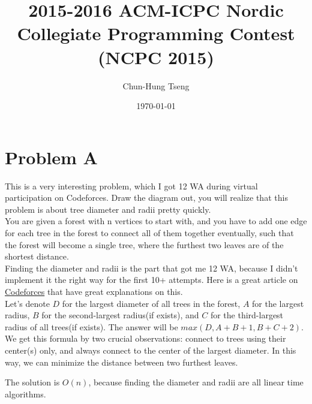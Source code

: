 \documentclass[10pt]{article}
\title{2015-2016 ACM-ICPC Nordic Collegiate Programming Contest (NCPC 2015)} %
\author{Chun-Hung Tseng}
\date{\today}
\begin{document}
 

\begin{titlepage}
\maketitle
\end{titlepage}




\section*{Problem A}

This is a very interesting problem, which I got 12 WA during virtual participation on Codeforces. Draw the diagram out, you will realize that this problem is about tree diameter and radii pretty quickly. \\

You are given a forest with n vertices to start with, and you have to add one edge for each tree in the forest to connect all of them together eventually, such that the forest will become a single tree, where the furthest two leaves are of the shortest distance.\\ 

Finding the diameter and radii is the part that got me 12 WA, because I didn't implement it the right way for the first 10+ attempts. Here is a great article on \href{http://codeforces.com/blog/entry/17974}{Codeforces} that have great explanations on this. \\

Let's denote $D$ for the largest diameter of all trees in the forest, $A$ for the largest radius, $B$ for the second-largest radius(if exists), and $C$ for the third-largest radius of all trees(if exists). The answer will be $max(D, A+B+1, B+C+2)$. We get this formula by two crucial observations: connect to trees using their center(s) only, and always connect to the center of the largest diameter. In this way, we can minimize the distance between two furthest leaves.

The solution is $O(n)$, because finding the diameter and radii are all linear time algorithms.


\end{document}
